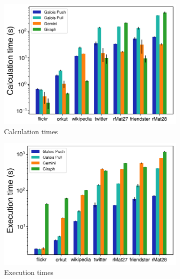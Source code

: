 \documentclass{meetings}
\begin{document}
\begin{figure}
	\centering
	\begin{subfigure}{0.32\textwidth}
		\includegraphics[width=\linewidth]{../../plots/distributedSSSP_calcTime.png}
		\caption{Calculation times}
		\label{fig:distributedSSSP_calc}
	\end{subfigure}
	\hfil
	\begin{subfigure}{0.32\textwidth}
		\includegraphics[width=\linewidth]{../../plots/distributedSSSP_execTime.png}
		\caption{Execution times}
		\label{fig:distributedSSSP_exec}
	\end{subfigure}
	\hfil
	\begin{subfigure}{0.32\textwidth}

\end{subfigure}
\end{figure}
\end{document}
